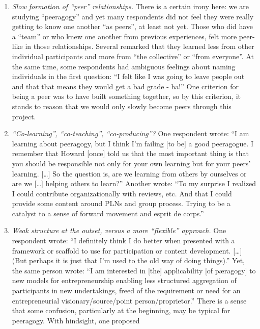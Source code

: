 \begin{enumerate}
\def\labelenumi{\arabic{enumi}.}
\item
  \emph{Slow formation of ``peer'' relationships.} There is a certain
  irony here: we are studying ``peeragogy'' and yet many respondents did
  not feel they were really getting to know one another ``as peers'', at
  least not yet. Those who did have a ``team'' or who knew one another
  from previous experiences, felt more peer-like in those relationships.
  Several remarked that they learned less from other individual
  participants and more from ``the collective'' or ``from everyone''. At
  the same time, some respondents had ambiguous feelings about naming
  individuals in the first question: ``I felt like I was going to leave
  people out and that that means they would get a bad grade - ha!'' One
  criterion for being a peer was to have built something together, so by
  this criterion, it stands to reason that we would only slowly become
  peers through this project.
\item
  \emph{``Co-learning'', ``co-teaching'', ``co-producing''?} One
  respondent wrote: ``I am learning about peeragogy, but I think I'm
  failing {{[}to be{]}} a good peeragogue. I remember that Howard
  {{[}once{]}} told us that the most important thing is that you should
  be responsible not only for your own learning but for your peers'
  learning. {{[}\ldots{}{]}} So the question is, are we learning from
  others by ourselves or are we {{[}\ldots{}{]}} helping others to
  learn?'' Another wrote: ``To my surprise I realized I could contribute
  organizationally with reviews, etc. And that I could provide some
  content around PLNs and group process. Trying to be a catalyst to a
  sense of forward movement and esprit de corps.''
\item
  \emph{Weak structure at the outset, versus a more ``flexible''
  approach.} One respondent wrote: ``I definitely think I do better when
  presented with a framework or scaffold to use for participation or
  content development. {{[}\ldots{}{]}} (But perhaps it is just that I'm
  used to the old way of doing things).'' Yet, the same person wrote:
  ``I am interested in {{[}the{]}} applicability {{[}of pæragogy{]}} to
  new models for entrepreneurship enabling less structured aggregation
  of participants in new undertakings, freed of the requirement or need
  for an entrepreneurial visionary/source/point person/proprietor.''
  There is a sense that some confusion, particularly at the beginning,
  may be typical for peeragogy. With hindsight, one proposed

\end{enumerate}
